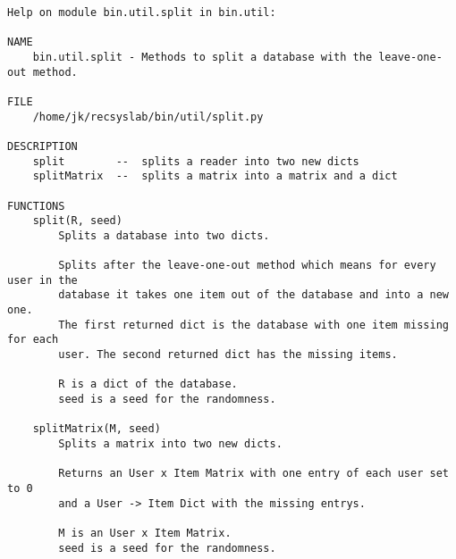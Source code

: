 \begin{lstlisting}
Help on module bin.util.split in bin.util:

NAME
    bin.util.split - Methods to split a database with the leave-one-out method.

FILE
    /home/jk/recsyslab/bin/util/split.py

DESCRIPTION
    split        --  splits a reader into two new dicts
    splitMatrix  --  splits a matrix into a matrix and a dict

FUNCTIONS
    split(R, seed)
        Splits a database into two dicts.
        
        Splits after the leave-one-out method which means for every user in the
        database it takes one item out of the database and into a new one.
        The first returned dict is the database with one item missing for each
        user. The second returned dict has the missing items.
        
        R is a dict of the database.
        seed is a seed for the randomness.
    
    splitMatrix(M, seed)
        Splits a matrix into two new dicts.
        
        Returns an User x Item Matrix with one entry of each user set to 0
        and a User -> Item Dict with the missing entrys.
        
        M is an User x Item Matrix.
        seed is a seed for the randomness.
\end{lstlisting}

